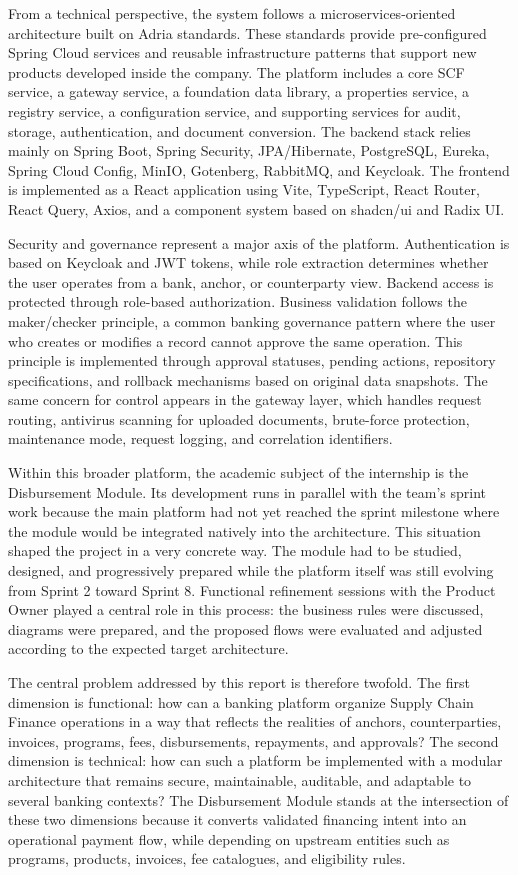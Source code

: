 From a technical perspective, the system follows a microservices-oriented architecture built on Adria standards. These standards provide pre-configured Spring Cloud services and reusable infrastructure patterns that support new products developed inside the company. The platform includes a core SCF service, a gateway service, a foundation data library, a properties service, a registry service, a configuration service, and supporting services for audit, storage, authentication, and document conversion. The backend stack relies mainly on Spring Boot, Spring Security, JPA/Hibernate, PostgreSQL, Eureka, Spring Cloud Config, MinIO, Gotenberg, RabbitMQ, and Keycloak. The frontend is implemented as a React application using Vite, TypeScript, React Router, React Query, Axios, and a component system based on shadcn/ui and Radix UI.

Security and governance represent a major axis of the platform. Authentication is based on Keycloak and JWT tokens, while role extraction determines whether the user operates from a bank, anchor, or counterparty view. Backend access is protected through role-based authorization. Business validation follows the maker/checker principle, a common banking governance pattern where the user who creates or modifies a record cannot approve the same operation. This principle is implemented through approval statuses, pending actions, repository specifications, and rollback mechanisms based on original data snapshots. The same concern for control appears in the gateway layer, which handles request routing, antivirus scanning for uploaded documents, brute-force protection, maintenance mode, request logging, and correlation identifiers.

Within this broader platform, the academic subject of the internship is the Disbursement Module. Its development runs in parallel with the team's sprint work because the main platform had not yet reached the sprint milestone where the module would be integrated natively into the architecture. This situation shaped the project in a very concrete way. The module had to be studied, designed, and progressively prepared while the platform itself was still evolving from Sprint 2 toward Sprint 8. Functional refinement sessions with the Product Owner played a central role in this process: the business rules were discussed, diagrams were prepared, and the proposed flows were evaluated and adjusted according to the expected target architecture.

The central problem addressed by this report is therefore twofold. The first dimension is functional: how can a banking platform organize Supply Chain Finance operations in a way that reflects the realities of anchors, counterparties, invoices, programs, fees, disbursements, repayments, and approvals? The second dimension is technical: how can such a platform be implemented with a modular architecture that remains secure, maintainable, auditable, and adaptable to several banking contexts? The Disbursement Module stands at the intersection of these two dimensions because it converts validated financing intent into an operational payment flow, while depending on upstream entities such as programs, products, invoices, fee catalogues, and eligibility rules.


